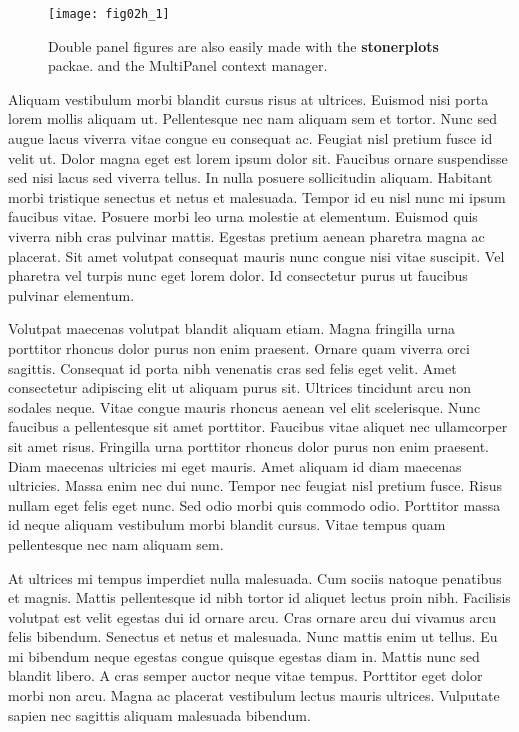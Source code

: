 \begin{figure}
	\centering
	\texttt{[image: fig02h\_1]}
	\caption{Double panel figures are also easily made with the \textbf{stonerplots}\cite{stonerplots} packae.
	and the MultiPanel context manager.}
	\label{fig:fig_label}
\end{figure}



Aliquam vestibulum morbi blandit cursus risus at ultrices. Euismod nisi porta lorem mollis aliquam ut. Pellentesque nec nam aliquam sem et tortor. Nunc sed augue lacus viverra vitae congue eu consequat ac. Feugiat nisl pretium fusce id velit ut. Dolor magna eget est lorem ipsum dolor sit. Faucibus ornare suspendisse sed nisi lacus sed viverra tellus. In nulla posuere sollicitudin aliquam. Habitant morbi tristique senectus et netus et malesuada. Tempor id eu nisl nunc mi ipsum faucibus vitae. Posuere morbi leo urna molestie at elementum. Euismod quis viverra nibh cras pulvinar mattis. Egestas pretium aenean pharetra magna ac placerat. Sit amet volutpat consequat mauris nunc congue nisi vitae suscipit. Vel pharetra vel turpis nunc eget lorem dolor. Id consectetur purus ut faucibus pulvinar elementum.


Volutpat maecenas volutpat blandit aliquam etiam. Magna fringilla urna porttitor rhoncus dolor purus non enim praesent. Ornare quam viverra orci sagittis. Consequat id porta nibh venenatis cras sed felis eget velit. Amet consectetur adipiscing elit ut aliquam purus sit. Ultrices tincidunt arcu non sodales neque. Vitae congue mauris rhoncus aenean vel elit scelerisque. Nunc faucibus a pellentesque sit amet porttitor. Faucibus vitae aliquet nec ullamcorper sit amet risus. Fringilla urna porttitor rhoncus dolor purus non enim praesent. Diam maecenas ultricies mi eget mauris. Amet aliquam id diam maecenas ultricies. Massa enim nec dui nunc. Tempor nec feugiat nisl pretium fusce. Risus nullam eget felis eget nunc. Sed odio morbi quis commodo odio. Porttitor massa id neque aliquam vestibulum morbi blandit cursus. Vitae tempus quam pellentesque nec nam aliquam sem.

At ultrices mi tempus imperdiet nulla malesuada. Cum sociis natoque penatibus et magnis. Mattis pellentesque id nibh tortor id aliquet lectus proin nibh. Facilisis volutpat est velit egestas dui id ornare arcu. Cras ornare arcu dui vivamus arcu felis bibendum. Senectus et netus et malesuada. Nunc mattis enim ut tellus. Eu mi bibendum neque egestas congue quisque egestas diam in. Mattis nunc sed blandit libero. A cras semper auctor neque vitae tempus. Porttitor eget dolor morbi non arcu. Magna ac placerat vestibulum lectus mauris ultrices. Vulputate sapien nec sagittis aliquam malesuada bibendum.